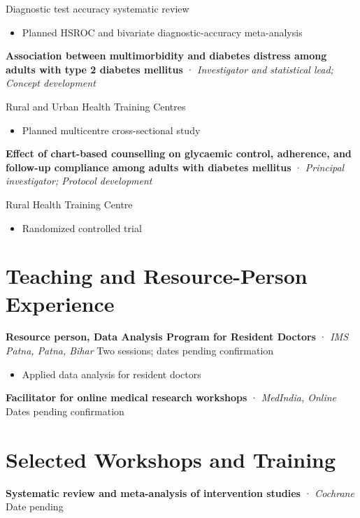 \documentclass[
  english,
  10pt,
]{article}
\providecommand{\tightlist}{%
  \setlength{\itemsep}{0pt}\setlength{\parskip}{0pt}}
\begin{document}
Diagnostic test accuracy systematic review

\begin{itemize}
\tightlist
\item
  Planned HSROC and bivariate diagnostic-accuracy meta-analysis
\end{itemize}

\textbf{Association between multimorbidity and diabetes distress among
adults with type 2 diabetes mellitus} · \emph{Investigator and
statistical lead; Concept development}

Rural and Urban Health Training Centres

\begin{itemize}
\tightlist
\item
  Planned multicentre cross-sectional study
\end{itemize}

\textbf{Effect of chart-based counselling on glycaemic control,
adherence, and follow-up compliance among adults with diabetes mellitus}
· \emph{Principal investigator; Protocol development}

Rural Health Training Centre

\begin{itemize}
\tightlist
\item
  Randomized controlled trial
\end{itemize}

\section{Teaching and Resource-Person Experience}

\textbf{Resource person, Data Analysis Program for Resident Doctors} ·
\emph{IMS Patna, Patna, Bihar} \textbar{} Two sessions; dates pending
confirmation

\begin{itemize}
\tightlist
\item
  Applied data analysis for resident doctors
\end{itemize}

\textbf{Facilitator for online medical research workshops} ·
\emph{MedIndia, Online} \textbar{} Dates pending confirmation

\section{Selected Workshops and Training}

\textbf{Systematic review and meta-analysis of intervention studies} ·
\emph{Cochrane} \textbar{} Date pending
\end{document}
